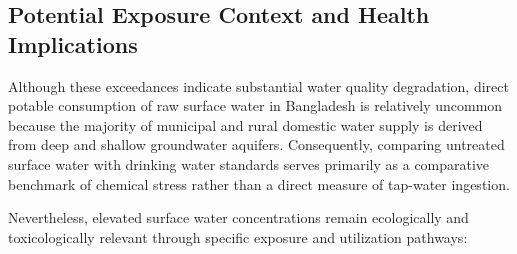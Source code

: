 \documentclass[authoryear,preprint,12pt]{elsarticle}
\begin{document}
\subsection{Potential Exposure Context and Health Implications}
Although these exceedances indicate substantial water quality degradation, direct potable consumption of raw surface water in Bangladesh is relatively uncommon because the majority of municipal and rural domestic water supply is derived from deep and shallow groundwater aquifers. Consequently, comparing untreated surface water with drinking water standards serves primarily as a comparative benchmark of chemical stress rather than a direct measure of tap-water ingestion.

Nevertheless, elevated surface water concentrations remain ecologically and toxicologically relevant through specific exposure and utilization pathways:
\end{document}

